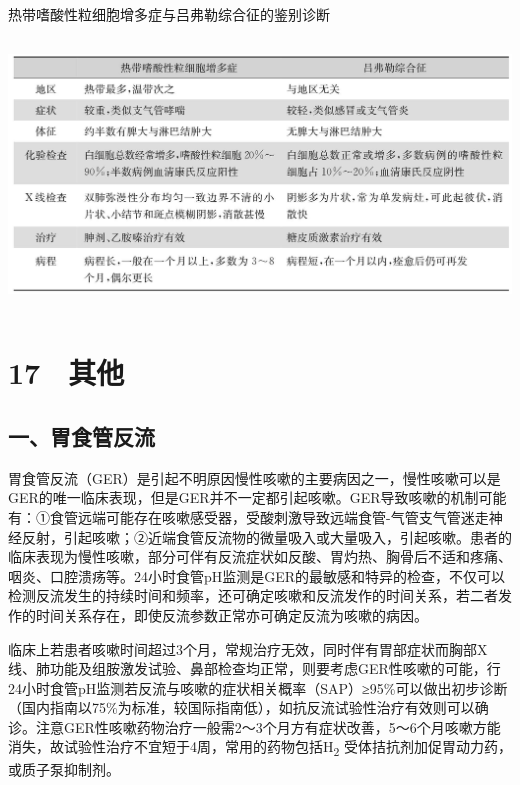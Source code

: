 \begin{table}[htbp]
\centering
\caption{热带嗜酸性粒细胞增多症与吕弗勒综合征的鉴别诊断}
\label{tab5-5}
\includegraphics[width=5.91667in,height=2.82292in]{./images/Image00048.jpg}
\end{table}

\protect\hypertarget{text00067.html}{}{}

\section{17　其他}

\subsection{一、胃食管反流}

胃食管反流（GER）是引起不明原因慢性咳嗽的主要病因之一，慢性咳嗽可以是GER的唯一临床表现，但是GER并不一定都引起咳嗽。GER导致咳嗽的机制可能有：①食管远端可能存在咳嗽感受器，受酸刺激导致远端食管-气管支气管迷走神经反射，引起咳嗽；②近端食管反流物的微量吸入或大量吸入，引起咳嗽。患者的临床表现为慢性咳嗽，部分可伴有反流症状如反酸、胃灼热、胸骨后不适和疼痛、咽炎、口腔溃疡等。24小时食管pH监测是GER的最敏感和特异的检查，不仅可以检测反流发生的持续时间和频率，还可确定咳嗽和反流发作的时间关系，若二者发作的时间关系存在，即使反流参数正常亦可确定反流为咳嗽的病因。

临床上若患者咳嗽时间超过3个月，常规治疗无效，同时伴有胃部症状而胸部X线、肺功能及组胺激发试验、鼻部检查均正常，则要考虑GER性咳嗽的可能，行24小时食管pH监测若反流与咳嗽的症状相关概率（SAP）≥95\%可以做出初步诊断（国内指南以75\%为标准，较国际指南低），如抗反流试验性治疗有效则可以确诊。注意GER性咳嗽药物治疗一般需2～3个月方有症状改善，5～6个月咳嗽方能消失，故试验性治疗不宜短于4周，常用的药物包括H\textsubscript{2}
受体拮抗剂加促胃动力药，或质子泵抑制剂。

